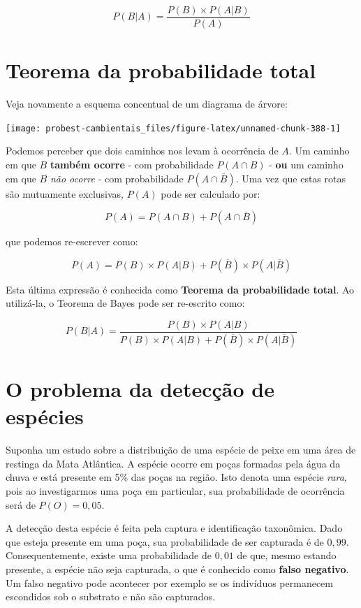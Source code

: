 \documentclass[
]{book}
\begin{document}
\[P(B|A) = \frac{P(B) \times P(A|B)}{P(A)}\]

\hypertarget{teorema-da-probabilidade-total}{%
\section{Teorema da probabilidade total}\label{teorema-da-probabilidade-total}}

Veja novamente a esquema concentual de um diagrama de árvore:

\begin{center}\texttt{[image: probest-cambientais\_files/figure-latex/unnamed-chunk-388-1]} \end{center}

Podemos perceber que dois caminhos nos levam à ocorrência de \(A\). Um caminho em que \(B\) \textbf{também ocorre} - com probabilidade \(P(A \cap B)\) - \textbf{ou} um caminho em que \(B\) \emph{não ocorre} - com probabilidade \(P(A \cap \overline{B})\). Uma vez que estas rotas são mutuamente exclusivas, \(P(A)\) pode ser calculado por:

\[P(A) = P(A \cap B) + P(A \cap \overline{B})\]

que podemos re-escrever como:

\[P(A) = P(B) \times P(A|B) + P(\overline{B}) \times P(A|\overline{B})\]

Esta última expressão é conhecida como \textbf{Teorema da probabilidade total}. Ao utilizá-la, o Teorema de Bayes pode ser re-escrito como:

\[P(B|A) = \frac{P(B) \times P(A|B)}{P(B) \times P(A|B) + P(\overline{B}) \times P(A|\overline{B})}\]

\hypertarget{o-problema-da-detecuxe7uxe3o-de-espuxe9cies}{%
\section{O problema da detecção de espécies}\label{o-problema-da-detecuxe7uxe3o-de-espuxe9cies}}

Suponha um estudo sobre a distribuição de uma espécie de peixe em uma área de restinga da Mata Atlântica. A espécie ocorre em poças formadas pela água da chuva e está presente em 5\% das poças na região. Isto denota uma espécie \emph{rara}, pois ao investigarmos uma poça em particular, sua probabilidade de ocorrência será de \(P(O) = 0,05\).

A detecção desta espécie é feita pela captura e identificação taxonômica. Dado que esteja presente em uma poça, sua probabilidade de ser capturada é de \(0,99\). Consequentemente, existe uma probabilidade de \(0,01\) de que, mesmo estando presente, a espécie não seja capturada, o que é conhecido como \textbf{falso negativo}. Um falso negativo pode acontecer por exemplo se os indivíduos permanecem escondidos sob o substrato e não são capturados.
\end{document}
